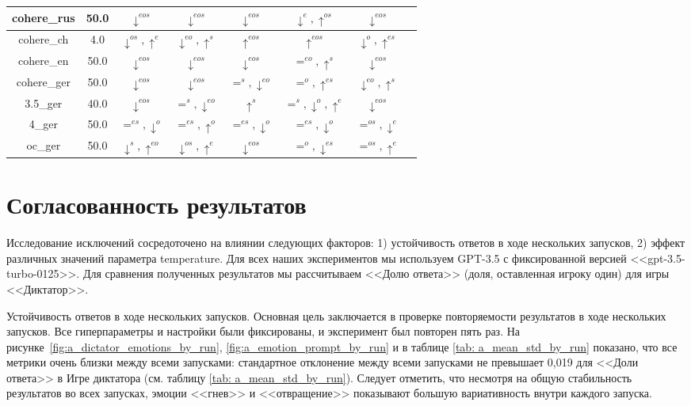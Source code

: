 \begin{small}
\begin{longtable}[c]{|c|c|c|c|c|c|c|c|}
\hline
cohere\_rus & 50.0 & $\downarrow^{eos}$ & $\downarrow^{eos}$ & $\downarrow^{eos}$ & $\downarrow^{e},\uparrow^{os}$ & $\downarrow^{eos}$ \\
\hline
cohere\_ch & 4.0 & $\downarrow^{os},\uparrow^{e}$ & $\downarrow^{eo},\uparrow^{s}$ & $\uparrow^{eos}$ & $\uparrow^{eos}$ & $\downarrow^{o},\uparrow^{es}$ \\
\hline
cohere\_en & 50.0 & $\downarrow^{eos}$ & $\downarrow^{eos}$ & $\downarrow^{eos}$ & $=^{eo},\uparrow^{s}$ & $\downarrow^{eos}$ \\
\hline
cohere\_ger & 50.0 & $\downarrow^{eos}$ & $\downarrow^{eos}$ & $=^{s},\downarrow^{eo}$ & $=^{o},\uparrow^{es}$ & $\downarrow^{eo},\uparrow^{s}$ \\
\hline
3.5\_ger & 40.0 & $\downarrow^{eos}$ & $=^{s},\downarrow^{eo}$ & $\uparrow^{s}$ & $=^{s},\downarrow^{o},\uparrow^{e}$ & $\downarrow^{eos}$ \\
\hline
4\_ger & 50.0 & $=^{es},\downarrow^{o}$ & $=^{es},\uparrow^{o}$ & $=^{es},\downarrow^{o}$ & $=^{es},\downarrow^{o}$ & $=^{os},\downarrow^{e}$ \\
\hline
oc\_ger & 50.0 & $\downarrow^{s},\uparrow^{eo}$ & $\downarrow^{os},\uparrow^{e}$ & $\downarrow^{eos}$ & $=^{o},\downarrow^{es}$ & $=^{os},\uparrow^{e}$ \\
\end{longtable}
\end{small}


\section{Согласованность результатов}

Исследование исключений сосредоточено на влиянии следующих факторов: 1) устойчивость ответов в ходе нескольких запусков, 2) эффект различных значений параметра temperature. Для всех наших экспериментов мы используем GPT-3.5 с фиксированной версией <<gpt-3.5-turbo-0125>>. Для сравнения полученных результатов мы рассчитываем <<Долю ответа>> (доля, оставленная игроку один) для игры <<Диктатор>>.


Устойчивость ответов в ходе нескольких запусков. Основная цель заключается в проверке повторяемости результатов в ходе нескольких запусков. Все гиперпараметры и настройки были фиксированы, и эксперимент был повторен пять раз. На рисунке~\ref{fig:a_dictator_emotions_by_run}, \ref{fig:a_emotion_prompt_by_run} и в таблице \ref{tab: a_mean_std_by_run} показано, что все метрики очень близки между всеми запусками: стандартное отклонение между всеми запусками не превышает 0,019 для <<Доли ответа>> в Игре диктатора (см. таблицу \ref{tab: a_mean_std_by_run}). Следует отметить, что несмотря на общую стабильность результатов во всех запусках, эмоции <<гнев>> и <<отвращение>> показывают большую вариативность внутри каждого запуска.

